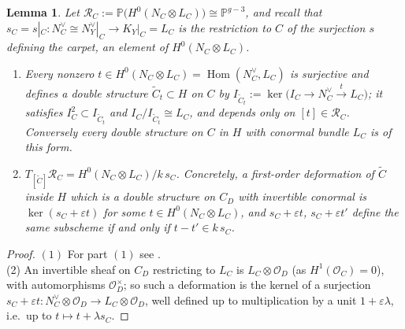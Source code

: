 \documentclass[11pt,twoside]{amsart}
\theoremstyle{plain}
\newtheorem{lemma}[theorem]{Lemma}
\theoremstyle{definition}
\newcommand{\PP}{\mathbb{P}}
\newcommand{\OO}{\mathcal{O}}
\newcommand{\Hom}{\operatorname{Hom}}
\newcommand{\Yt}{\widetilde{Y}}
\newcommand{\Ct}{\widetilde{C}}
\newcommand{\RC}{\mathcal{R}_C}
\newcommand{\Dd}{D}
\begin{document}
\begin{lemma}\label{lem:RC}
Let $\RC:=\PP\big(H^0(N_C\otimes L_C)\big)\cong\PP^{g-3}$, and recall that $s_C=s|_C\colon N_C^{\vee}\cong N_Y^{\vee}|_C\to K_Y|_C=L_C$ is the restriction to $C$ of the surjection $s$ defining the carpet, an element of $H^0(N_C\otimes L_C)$.
\begin{enumerate}
\item Every nonzero $t\in H^0(N_C\otimes L_C)=\Hom(N_C^{\vee},L_C)$ is surjective and defines a double structure $\Ct_t\subset H$ on $C$ by $I_{\Ct_t}:=\ker\big(I_C\to N_C^{\vee}\xrightarrow{t}L_C\big)$; it satisfies $I_C^2\subset I_{\Ct_t}$ and $I_C/I_{\Ct_t}\cong L_C$, and depends only on $[t]\in\RC$. Conversely every double structure on $C$ in $H$ with conormal bundle $L_C$ is of this form. 
\item $T_{[\Ct]}\RC=H^0(N_C\otimes L_C)/k\,s_C$. Concretely, a first-order deformation of $\Ct$ inside $H$ which is a double structure on $C_\Dd$ with invertible conormal is $\ker(s_C+\varepsilon t)$ for some $t\in H^0(N_C\otimes L_C)$, and $s_C+\varepsilon t$, $s_C+\varepsilon t'$ define the same subscheme if and only if $t-t'\in k\,s_C$.
\end{enumerate}
\end{lemma}

\begin{proof}
$(1)$ For part $(1)$ see \cite[\S1]{BE95}. \\
(2) An invertible sheaf on $C_\Dd$ restricting to $L_C$ is $L_C\otimes\OO_\Dd$ (as $H^1(\OO_C)=0$), with automorphisms $\OO_\Dd^{\times}$; so such a deformation is the kernel of a surjection $s_C+\varepsilon t\colon N_C^{\vee}\otimes\OO_\Dd\to L_C\otimes\OO_\Dd$, well defined up to multiplication by a unit $1+\varepsilon\lambda$, i.e.\ up to $t\mapsto t+\lambda s_C$.
\end{proof}
\end{document}

